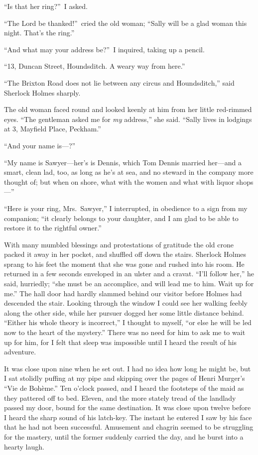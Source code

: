 \documentclass[12pt,english,oneside]{book}
\newcommand{\mdsh}[1]{\mbox{#1}\linebreak[1]}
\begin{document}
{}``Is that her ring?''\ I asked.

{}``The Lord be thanked!''\ cried the old woman; {}``Sally will
be a glad woman this night. That's the ring.''

{}``And what may your address be?''\ I inquired, taking up a pencil.

{}``13, Duncan Street, Houndsditch. A weary way from here.''

{}``The Brixton Road does not lie between any circus and Houndsditch,''
said Sherlock Holmes sharply.

The old woman faced round and looked keenly at him from her little
red-rimmed eyes. {}``The gentleman asked me for \textit{my} address,''
she said. {}``Sally lives in lodgings at 3, Mayfield Place, Peckham.''

{}``And your name is\mdsh{---}?''

{}``My name is Sawyer\mdsh{---}her's is Dennis, which Tom Dennis
married her\mdsh{---}and a smart, clean lad, too, as long as he's
at sea, and no steward in the company more thought of; but when on
shore, what with the women and what with liquor shops\mdsh{---}''

{}``Here is your ring, Mrs.\ Sawyer,'' I interrupted, in obedience
to a sign from my companion; {}``it clearly belongs to your daughter,
and I am glad to be able to restore it to the rightful owner.''

With many mumbled blessings and protestations of gratitude the old
crone packed it away in her pocket, and shuffled off down the stairs.
Sherlock Holmes sprang to his feet the moment that she was gone and
rushed into his room. He returned in a few seconds enveloped in an
ulster and a cravat. {}``I'll follow her,'' he said, hurriedly;
{}``she must be an accomplice, and will lead me to him. Wait up for
me.'' The hall door had hardly slammed behind our visitor before
Holmes had descended the stair. Looking through the window I could
see her walking feebly along the other side, while her pursuer dogged
her some little distance behind. {}``Either his whole theory is incorrect,''
I thought to myself, {}``or else he will be led now to the heart
of the mystery.'' There was no need for him to ask me to wait up
for him, for I felt that sleep was impossible until I heard the result
of his adventure.

It was close upon nine when he set out. I had no idea how long he
might be, but I sat stolidly puffing at my pipe and skipping over
the pages of Henri Murger's {}``Vie de Boh\`{e}me.'' Ten o'clock passed,
and I heard the footsteps of the maid as they pattered off to bed.
Eleven, and the more stately tread of the landlady passed my door,
bound for the same destination. It was close upon twelve before I
heard the sharp sound of his latch-key. The instant he entered I saw
by his face that he had not been successful. Amusement and chagrin
seemed to be struggling for the mastery, until the former suddenly
carried the day, and he burst into a hearty laugh.
\end{document}
